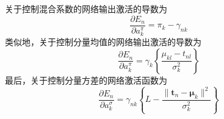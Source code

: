 关于控制混合系数的网络输出激活的导数为
\begin{equation}
	\frac{\partial E_n}{\partial a_k^{\pi}}=\pi_k-\gamma_{nk}
\end{equation}
类似地，关于控制分量均值的网络输出激活的导数为
\begin{equation}
	\frac{\partial E_n}{\partial a_k^{\pi}}=\gamma_{k}\left\{\frac{\mu_{kl}-t_{nl}}{\sigma_k^2} \right\}
\end{equation}
最后，关于控制分量方差的网络激活函数为
\begin{equation}
	\frac{\partial E_n}{\partial a_k^{\sigma}}=\gamma_{nk}\left\{L-\frac{\lVert \boldsymbol{t}_n - \boldsymbol{\mu}_k\rVert^2}{\sigma_k^2} \right\}
\end{equation}
